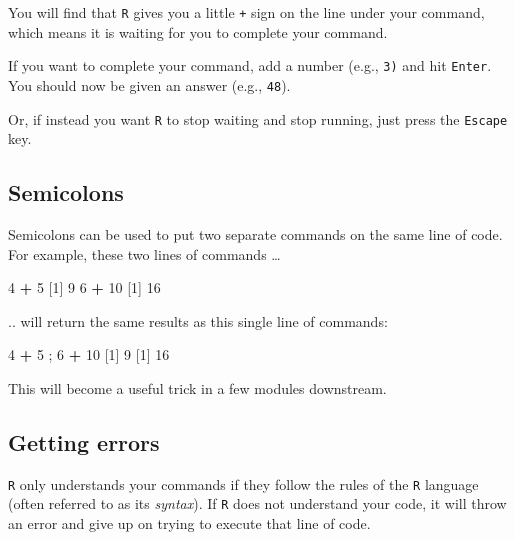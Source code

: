 \documentclass[]{book}
\newenvironment{Shaded}{\begin{snugshade}}{\end{snugshade}}
\newcommand{\DecValTok}[1]{\textcolor[rgb]{0.00,0.00,0.81}{#1}}
\newcommand{\NormalTok}[1]{#1}
\newcommand{\OperatorTok}[1]{\textcolor[rgb]{0.81,0.36,0.00}{\textbf{#1}}}
\newcommand{\StringTok}[1]{\textcolor[rgb]{0.31,0.60,0.02}{#1}}
\begin{document}
You will find that \texttt{R} gives you a little \texttt{+} sign on the line under your command, which means it is waiting for you to complete your command.

If you want to complete your command, add a number (e.g., \texttt{3)} and hit \texttt{Enter}. You should now be given an answer (e.g., \texttt{48}).

Or, if instead you want \texttt{R} to stop waiting and stop running, just press the \texttt{Escape} key.

\hypertarget{semicolons}{%
\subsection*{Semicolons}\label{semicolons}}

Semicolons can be used to put two separate commands on the same line of code. For example, these two lines of commands \ldots{}

\begin{Shaded}
\begin{Highlighting}[]
\DecValTok{4} \OperatorTok{+}\StringTok{ }\DecValTok{5}
\NormalTok{[}\DecValTok{1}\NormalTok{] }\DecValTok{9}
\DecValTok{6} \OperatorTok{+}\StringTok{ }\DecValTok{10}
\NormalTok{[}\DecValTok{1}\NormalTok{] }\DecValTok{16}
\end{Highlighting}
\end{Shaded}

.. will return the same results as this single line of commands:

\begin{Shaded}
\begin{Highlighting}[]
\DecValTok{4} \OperatorTok{+}\StringTok{ }\DecValTok{5}\NormalTok{ ; }\DecValTok{6} \OperatorTok{+}\StringTok{ }\DecValTok{10}
\NormalTok{[}\DecValTok{1}\NormalTok{] }\DecValTok{9}
\NormalTok{[}\DecValTok{1}\NormalTok{] }\DecValTok{16}
\end{Highlighting}
\end{Shaded}

This will become a useful trick in a few modules downstream.

\hypertarget{getting-errors}{%
\subsection*{Getting errors}\label{getting-errors}}

\texttt{R} only understands your commands if they follow the rules of the \texttt{R} language (often referred to as its \emph{syntax}). If \texttt{R} does not understand your code, it will throw an error and give up on trying to execute that line of code.
\end{document}
